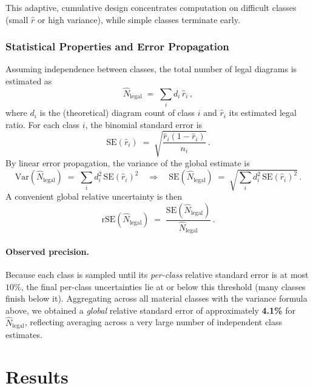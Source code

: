 \documentclass[12pt]{article}
\begin{document}
This adaptive, cumulative design concentrates computation on difficult classes (small $\hat{r}$ or high variance), while simple classes terminate early.

\subsubsection{Statistical Properties and Error Propagation}

Assuming independence between classes, the total number of legal diagrams is estimated as
\begin{equation}
\hat{N}_{\text{legal}} \;=\; \sum_{i} d_i\,\hat{r}_i \,,
\end{equation}
where $d_i$ is the (theoretical) diagram count of class $i$ and $\hat{r}_i$ its estimated legal ratio. For each class $i$, the binomial standard error is
\[
\mathrm{SE}(\hat{r}_i) \;=\; \sqrt{\frac{\hat{r}_i(1-\hat{r}_i)}{n_i}} \, .
\]
By linear error propagation, the variance of the global estimate is
\begin{equation}
\mathrm{Var}\!\left(\hat{N}_{\text{legal}}\right) \;=\; \sum_i d_i^2\,\mathrm{SE}(\hat{r}_i)^2
\quad\Rightarrow\quad
\mathrm{SE}\!\left(\hat{N}_{\text{legal}}\right) \;=\; 
\sqrt{ \sum_i d_i^2\,\mathrm{SE}(\hat{r}_i)^2 } \, .
\end{equation}
A convenient global relative uncertainty is then
\begin{equation}
\mathrm{rSE}\!\left(\hat{N}_{\text{legal}}\right)
\;=\;
\frac{\mathrm{SE}\!\left(\hat{N}_{\text{legal}}\right)}{\hat{N}_{\text{legal}}}\, .
\end{equation}

\paragraph{Observed precision.}
Because each class is sampled until its \emph{per-class} relative standard error is at most $10\%$, the final per-class uncertainties lie at or below this threshold (many classes finish below it). Aggregating across all material classes with the variance formula above, we obtained a \emph{global} relative standard error of approximately \textbf{4.1\%} for $\hat{N}_{\text{legal}}$, reflecting averaging across a very large number of independent class estimates.

\section{Results}
\end{document}
